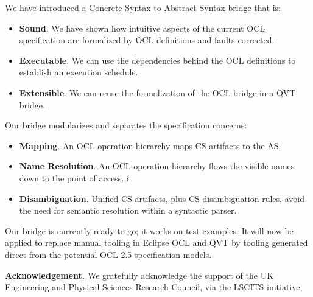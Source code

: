 \documentclass{llncs}
\begin{document}

We have introduced a Concrete Syntax to Abstract Syntax bridge that is:
\begin{itemize}
\item \textbf{Sound}. We have shown how intuitive aspects of the current OCL specification are formalized by OCL definitions and faults corrected.
\item \textbf{Executable}. We can use the dependencies behind the OCL definitions to establish an execution schedule.
\item \textbf{Extensible}. We can reuse the formalization of the OCL bridge in a QVT bridge.
\end{itemize}

Our bridge modularizes and separates the specification concerns:
\begin{itemize}
\item \textbf{Mapping}. An OCL operation hierarchy maps CS artifacts to the AS.
\item \textbf{Name Resolution}. An OCL operation hierarchy flows the visible names down to the point of access.
i\item \textbf{Disambiguation}. Unified CS artifacts, plus CS disambiguation rules, avoid the need for semantic resolution within a syntactic parser.
\end{itemize}

Our bridge is currently ready-to-go; it works on test examples. It will now be applied to replace manual tooling in Eclipse OCL and QVT by tooling generated direct from the potential OCL 2.5 specification models.

\vspace*{1mm}
\textbf{Acknowledgement.}
We gratefully acknowledge the support of the UK Engineering and Physical Sciences Research Council, via the LSCITS initiative,




\end{document}

